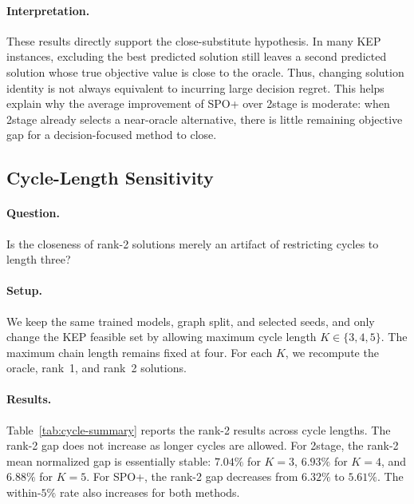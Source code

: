 \paragraph{Interpretation.}
These results directly support the close-substitute hypothesis. In many KEP
instances, excluding the best predicted solution still leaves a second predicted
solution whose true objective value is close to the oracle. Thus, changing
solution identity is not always equivalent to incurring large decision regret.
This helps explain why the average improvement of SPO+ over 2stage is moderate:
when 2stage already selects a near-oracle alternative, there is little remaining
objective gap for a decision-focused method to close.

\subsection{Cycle-Length Sensitivity}

\paragraph{Question.}
Is the closeness of rank-2 solutions merely an artifact of restricting cycles
to length three?

\paragraph{Setup.}
We keep the same trained models, graph split, and selected seeds, and only
change the KEP feasible set by allowing maximum cycle length $K \in
\{3,4,5\}$. The maximum chain length remains fixed at four. For each $K$, we
recompute the oracle, rank~1, and rank~2 solutions.

\paragraph{Results.}
Table~\ref{tab:cycle-summary} reports the rank-2 results across cycle lengths.
The rank-2 gap does not increase as longer cycles are allowed. For 2stage, the
rank-2 mean normalized gap is essentially stable: $7.04\%$ for $K=3$,
$6.93\%$ for $K=4$, and $6.88\%$ for $K=5$. For SPO+, the rank-2 gap decreases
from $6.32\%$ to $5.61\%$. The within-$5\%$ rate also increases for both
methods.

